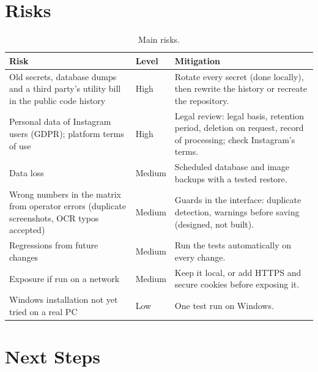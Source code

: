 \documentclass[10pt,a4paper]{scrartcl}
\newcommand{\RuleSection}[1]{%
    \section{#1}%
    \vspace{0.2em}{\color{accent!35}\hrule height 0.4pt}\vspace{0.3em}%
  }
\begin{document}
  \RuleSection{Risks}
  \label{sec:risks}

  \begin{table}[h]
  \small
  \centering
  \renewcommand{\arraystretch}{1.1}
  \begin{tabularx}{\textwidth}{@{}L{4.2cm} L{1.5cm} X@{}}
  \toprule
  \textbf{Risk} & \textbf{Level} & \textbf{Mitigation} \\[.3cm]
  \midrule
  Old secrets, database dumps and a third party's utility bill in the public code history & High & Rotate every secret (done locally), then rewrite the history or recreate the repository. \\[.3cm]
  Personal data of Instagram users (GDPR); platform terms of use & High & Legal review: legal basis, retention period, deletion on request, record of processing; check Instagram's terms. \\[.3cm]
  Data loss & Medium & Scheduled database and image backups with a tested restore. \\[.3cm]
  Wrong numbers in the matrix from operator errors (duplicate screenshots, OCR typos accepted) & Medium & Guards in the interface: duplicate detection, warnings before saving (designed, not built). \\[.3cm]
  Regressions from future changes & Medium & Run the tests automatically on every change. \\[.3cm]
  Exposure if run on a network & Medium & Keep it local, or add HTTPS and secure cookies before exposing it. \\[.3cm]
  Windows installation not yet tried on a real PC & Low & One test run on Windows. \\[.3cm]
  \bottomrule
  \end{tabularx}
  \caption{Main risks.}
  \label{tab:risks}
  \end{table}

  \clearpage
  \RuleSection{Next Steps}
  \label{sec:next}
\end{document}
